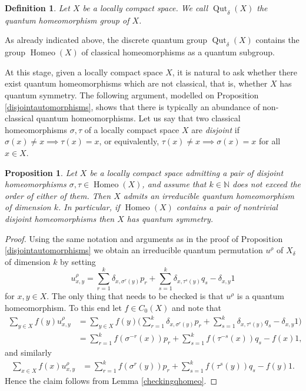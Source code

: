 \documentclass[a4paper]{amsart}
\DeclareMathOperator{\Homeo}{Homeo}
\DeclareMathOperator{\Qut}{Qut}
\numberwithin{equation}{section}
\theoremstyle{change}
\newtheorem{prop}[theorem]{Proposition}
\newtheorem{definition}[theorem]{Definition}
\begin{document}
\begin{definition} 
Let $ X $ be a locally compact space. We call $ \Qut_\delta(X) $ the quantum homeomorphism group of $ X $. 
\end{definition} 

As already indicated above, the discrete quantum group $ \Qut_\delta(X) $ contains the group $ \Homeo(X) $ of classical homeomorphisms as a quantum subgroup. 

At this stage, given a locally compact space $ X $, it is natural to ask whether there exist quantum homeomorphisms which are not classical, that is, whether $ X $ has quantum symmetry. The following argument, modelled on Proposition \ref{disjointautomorphisms}, shows that there is typically an 
abundance of non-classical quantum homeomorphisms. 
Let us say that two classical homeomorphisms $ \sigma, \tau $ of a locally compact space $ X $ are \emph{disjoint} if $ \sigma(x) \neq x \implies \tau(x) = x $, or equivalently, $ \tau(x) \neq x \implies \sigma(x) = x $ for all $ x \in X $. 

\begin{prop} \label{disjointhomeomorphisms}
Let $ X $ be a locally compact space admitting a pair of disjoint homeomorphisms $ \sigma, \tau \in \Homeo(X) $, and assume that $ k \in \mathbb{N} $ does not exceed the order
of either of them. Then $ X $ admits an irreducible quantum homeomorphism of dimension $ k $. In particular, if $ \Homeo(X) $ contains a pair of nontrivial 
disjoint homeomorphisms then $ X $ has quantum symmetry. 
\end{prop} 

\begin{proof} 
Using the same notation and arguments as in the proof of Proposition \ref{disjointautomorphisms} we obtain an irreducible quantum permutation $ u^\rho $ 
of $ X_\delta $ of dimension $ k $ by setting 
$$ 
u^\rho_{x,y} = \sum_{r = 1}^k \delta_{x, \sigma^r(y)} p_r + \sum_{s = 1}^k \delta_{x, \tau^s(y)} q_s - \delta_{x,y} 1
$$ 
for $ x, y \in X $. The only thing that needs to be checked is that $ u^\rho $ is a quantum homeomorphism. To this end let $ f \in C_0(X) $ and note that 
\begin{align*}
\sum_{y \in X} f(y) u^\rho_{x,y} &= \sum_{y \in X} f(y) \bigg(\sum_{r = 1}^k \delta_{x, \sigma^r(y)} p_r + \sum_{s = 1}^k \delta_{x, \tau^s(y)} q_s - \delta_{x,y} 1 \biggr) \\
&= \sum_{r = 1}^k f(\sigma^{-r}(x)) p_r + \sum_{s = 1}^k f(\tau^{-s}(x)) q_s - f(x) 1, 
\end{align*}
and similarly 
\begin{align*}
\sum_{x \in X} f(x) u^\rho_{x,y} &= \sum_{r = 1}^k f(\sigma^r(y)) p_r + \sum_{s = 1}^k f(\tau^s(y)) q_s - f(y) 1. 
\end{align*}
Hence the claim follows from Lemma \ref{checkingqhomeo}.  
\end{proof} 
\end{document}
